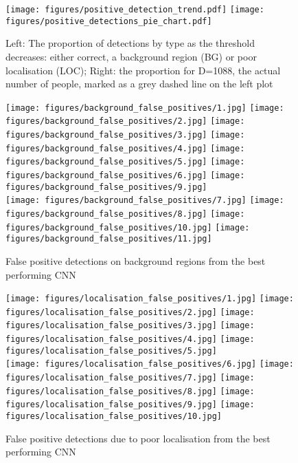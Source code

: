 \documentclass[runningheads]{llncs}
\begin{document}
\begin{figure}[p]
  \centering
  \texttt{[image: figures/positive\_detection\_trend.pdf]} \hfill
  \texttt{[image: figures/positive\_detections\_pie\_chart.pdf]}
  \caption{Left: The proportion of detections by type as the threshold decreases: either correct, a background region (BG) or poor localisation (LOC); Right: the proportion for D=1088, the actual number of people, marked as a grey dashed line on the left plot \label{fig:detectionTrend}}
  \bigskip

    \texttt{[image: figures/background\_false\_positives/1.jpg]} \hfill
    \texttt{[image: figures/background\_false\_positives/2.jpg]} \hfill
    \texttt{[image: figures/background\_false\_positives/3.jpg]} \hfill
    \texttt{[image: figures/background\_false\_positives/4.jpg]} \hfill
    \texttt{[image: figures/background\_false\_positives/5.jpg]} \hfill
    \texttt{[image: figures/background\_false\_positives/6.jpg]} \hfill
    \texttt{[image: figures/background\_false\_positives/9.jpg]} \\

    \texttt{[image: figures/background\_false\_positives/7.jpg]} \hfill
    \texttt{[image: figures/background\_false\_positives/8.jpg]} \hfill
    \texttt{[image: figures/background\_false\_positives/10.jpg]} \hfill
    \texttt{[image: figures/background\_false\_positives/11.jpg]}
    \caption{False positive detections on background regions from the best performing \ac{CNN}\label{fig:falsePositiveBackground}}
    \bigskip

    \texttt{[image: figures/localisation\_false\_positives/1.jpg]} \hfill
    \texttt{[image: figures/localisation\_false\_positives/2.jpg]} \hfill
    \texttt{[image: figures/localisation\_false\_positives/3.jpg]} \hfill
    \texttt{[image: figures/localisation\_false\_positives/4.jpg]} \hfill
    \texttt{[image: figures/localisation\_false\_positives/5.jpg]} \\

    \texttt{[image: figures/localisation\_false\_positives/6.jpg]} \hfill
    \texttt{[image: figures/localisation\_false\_positives/7.jpg]} \hfill
    \texttt{[image: figures/localisation\_false\_positives/8.jpg]} \hfill
    \texttt{[image: figures/localisation\_false\_positives/9.jpg]} \hfill
    \texttt{[image: figures/localisation\_false\_positives/10.jpg]}
\caption{False positive detections due to poor localisation from the best performing \ac{CNN}\label{fig:falsePositiveLocalisation}}
\end{figure}
\end{document}
